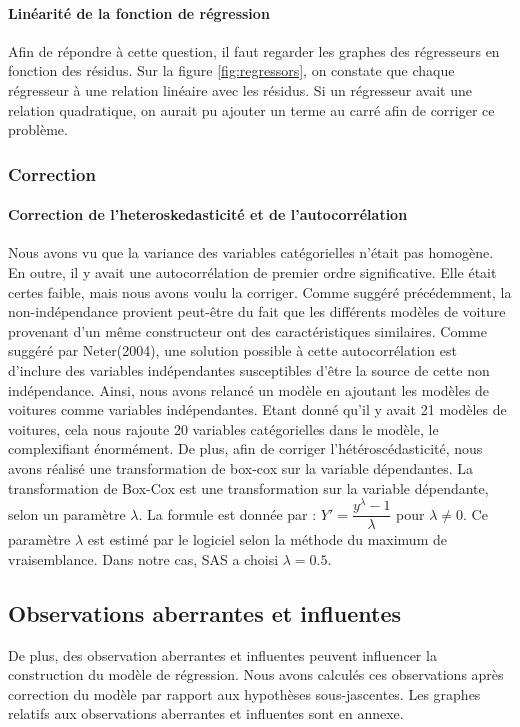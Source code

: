 \documentclass[11pt,a4paper]{article}
\begin{document}
\paragraph{Linéarité de la fonction de régression} Afin de répondre à cette question, il faut regarder les graphes des régresseurs en fonction des résidus. Sur la figure \ref{fig:regressors}, on constate que chaque régresseur à une relation linéaire avec les résidus. Si un régresseur avait une relation quadratique, on aurait pu ajouter un terme au carré afin de corriger ce problème.
\subsubsection{Correction}
\paragraph{Correction de l'heteroskedasticité et de l'autocorrélation}
Nous avons vu que la variance des variables catégorielles n'était pas homogène. En outre, il y avait une autocorrélation de premier ordre significative. Elle était certes faible, mais nous avons voulu la corriger. Comme suggéré précédemment, la non-indépendance provient peut-être du fait que les différents modèles de voiture provenant d'un même constructeur ont des caractéristiques similaires. Comme suggéré par Neter(2004), une solution possible à cette autocorrélation est d'inclure des variables indépendantes susceptibles d'être la source de cette non indépendance. Ainsi, nous avons relancé un modèle en ajoutant les modèles de voitures comme variables indépendantes. Etant donné qu'il y avait 21 modèles de voitures, cela nous rajoute 20 variables catégorielles dans le modèle, le complexifiant énormément. De plus, afin de corriger l'hétéroscédasticité, nous avons réalisé une transformation de box-cox sur la variable dépendantes. La transformation de Box-Cox est une transformation sur la variable dépendante, selon un paramètre $\lambda$. La formule est donnée par : $Y' = \dfrac{y^{\lambda} - 1}{\lambda}$ pour $ \lambda \neq 0$. Ce paramètre $\lambda$ est estimé par le logiciel selon la méthode du maximum de vraisemblance. Dans notre cas, SAS a choisi $\lambda = 0.5$.


\subsection{Observations aberrantes et influentes}
 De plus, des observation aberrantes et influentes peuvent influencer la construction du modèle de régression. Nous avons calculés ces observations après correction du modèle par rapport aux hypothèses sous-jascentes. Les graphes relatifs aux observations aberrantes et influentes sont en annexe.
\end{document}
